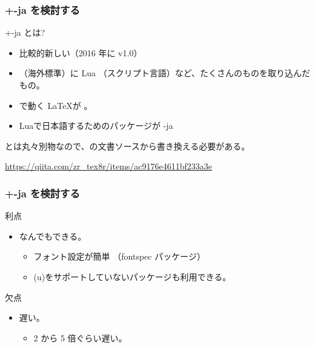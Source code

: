\documentclass[aspectratio=149]{beamer}
\begin{document}
\begin{frame}
	\frametitle{\LuaLaTeX+\LuaTeX-ja を検討する}
	\begin{block}{\LuaLaTeX+\LuaTeX-ja とは?}
		\begin{itemize}
			\item 比較的新しい（2016 年に v1.0）
			\item \pdfTeX （海外標準）に Lua （スクリプト言語）など、たくさんのものを取り込んだもの。
			\item \LuaTeX で動く \LaTeX が \LuaLaTeX。
			\item Lua\LaTeXTeX で日本語するためのパッケージが \LuaTeX-ja
		\end{itemize}
	\end{block}
	
	\pLaTeX とは丸々別物なので、\pLaTeX の文書ソースから書き換える必要がある。
	
	\url{https://qiita.com/zr_tex8r/items/ac9176e4611bf233a3e}
\end{frame}

\begin{frame}
	\frametitle{\LuaLaTeX+\LuaTeX-ja を検討する}
	\begin{block}{利点}
		\begin{itemize}
			\item なんでもできる。
				\begin{itemize}
					\item フォント設定が簡単 （fontspec パッケージ）
					\item (u)\pLaTeX をサポートしていないパッケージも利用できる。
				\end{itemize}
		\end{itemize}
	\end{block}
	\begin{block}{欠点}
		\begin{itemize}
			\item 遅い。
				\begin{itemize}
					\item 2 から 5 倍ぐらい遅い。
				\end{itemize}
		\end{itemize}
	\end{block}
\end{frame}
\end{document}
